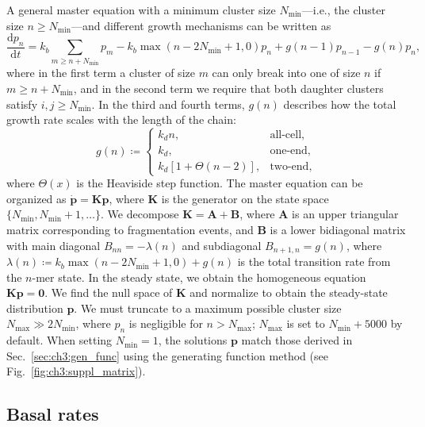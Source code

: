 A general master equation with a minimum cluster size $N_\textrm{min}$---i.e., the cluster size $n\geqslant N_\textrm{min}$---and different growth mechanisms can be written as
\begin{equation}\label{eq:ch3:generalmaster}
   \frac{\mathrm{d} p_n}{\mathrm{d} t} = k_b\sum_{m\geqslant n+N_{\min}}p_m - k_b\max(n-2N_{\min}+1, 0)p_n + g(n-1)p_{n-1}-g(n)p_n,
\end{equation}
where in the first term a cluster of size $m$ can only break into one of size $n$ if $m\geqslant n+N_\textrm{min}$, and in the second term we require that both daughter clusters satisfy $i,j\geqslant N_\textrm{min}$. In the third and fourth terms, $g(n)$ describes how the total growth rate scales with the length of the chain:
\begin{equation}
    g(n)\coloneq
    \begin{cases}
        k_d n, & \text{all-cell,}\\
        k_d, & \text{one-end,}\\
        k_d[1+\Theta(n-2)], & \text{two-end,}
    \end{cases}
\end{equation}
where $\Theta(x)$ is the Heaviside step function. The master equation can be organized as $\dot{\mathbf{p}} = \bm{K}\mathbf{p}$, where $\bm{K}$ is the generator on the state space $\{N_\textrm{min}, N_{\textrm{min}}+1, \ldots\}$. We decompose $\bm{K}=\bm{A}+\bm{B}$, where $\bm{A}$ is an upper triangular matrix corresponding to fragmentation events, and $\bm{B}$ is a lower bidiagonal matrix with main diagonal $B_{nn}=-\lambda(n)$ and subdiagonal $B_{n+1, n}=g(n)$, where $\lambda(n)\coloneq k_b\max(n-2N_{\min}+1, 0)+g(n)$ is the total transition rate from the $n$-mer state. In the steady state, we obtain the homogeneous equation $\bm{K}\mathbf{p}=\mathbf{0}$. We find the null space of $\bm{K}$ and normalize to obtain the steady-state distribution $\mathbf{p}$. We must truncate to a maximum possible cluster size $N_\mathrm{max}\gg 2N_\mathrm{min}$, where $p_n$ is negligible for $n>N_\mathrm{max}$; $N_\textrm{max}$ is set to $N_\mathrm{min}+5000$ by default. When setting $N_{\min}=1$, the solutions $\mathbf{p}$ match those derived in Sec.~\ref{sec:ch3:gen_func} using the generating function method (see Fig.~\ref{fig:ch3:suppl_matrix}).


\subsection{Basal rates}
\label{sec:ch3:basal}

